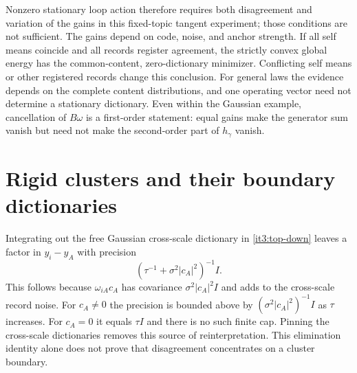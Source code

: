 Nonzero stationary loop action therefore requires both disagreement and variation of the gains in this fixed-topic tangent experiment; those conditions are not sufficient. The gains depend on code, noise, and anchor strength. If all self means coincide and all records register agreement, the strictly convex global energy has the common-content, zero-dictionary minimizer. Conflicting self means or other registered records change this conclusion. For general laws the evidence depends on the complete content distributions, and one operating vector need not determine a stationary dictionary. Even within the Gaussian example, cancellation of $B\omega$ is a first-order statement: equal gains make the generator sum vanish but need not make the second-order part of $h_\gamma$ vanish.

\section{Rigid clusters and their boundary dictionaries}
\label{it3:ch-hierarchy}

Integrating out the free Gaussian cross-scale dictionary in \cref{it3:top-down} leaves a factor in $y_i-y_A$ with precision
\begin{equation}
(\tau^{-1}+\sigma^2|c_A|^2)^{-1}I.
\end{equation}
This follows because $\omega_{iA}c_A$ has covariance $\sigma^2|c_A|^2I$ and adds to the cross-scale record noise. For $c_A\ne0$ the precision is bounded above by $(\sigma^2|c_A|^2)^{-1}I$ as $\tau$ increases. For $c_A=0$ it equals $\tau I$ and there is no such finite cap. Pinning the cross-scale dictionaries removes this source of reinterpretation. This elimination identity alone does not prove that disagreement concentrates on a cluster boundary.

